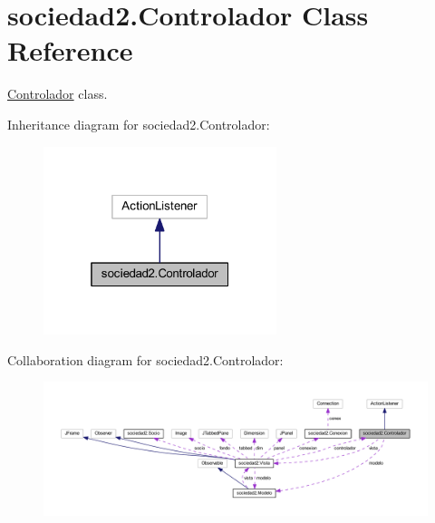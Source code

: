 \hypertarget{classsociedad2_1_1_controlador}{}\section{sociedad2.\+Controlador Class Reference}
\label{classsociedad2_1_1_controlador}


\mbox{\hyperlink{classsociedad2_1_1_controlador}{Controlador}} class.  




Inheritance diagram for sociedad2.\+Controlador\+:\nopagebreak
\begin{figure}[H]
\begin{center}
\leavevmode
\includegraphics[width=193pt]{classsociedad2_1_1_controlador__inherit__graph}
\end{center}
\end{figure}


Collaboration diagram for sociedad2.\+Controlador\+:
\nopagebreak
\begin{figure}[H]
\begin{center}
\leavevmode
\includegraphics[width=350pt]{classsociedad2_1_1_controlador__coll__graph}
\end{center}
\end{figure}
